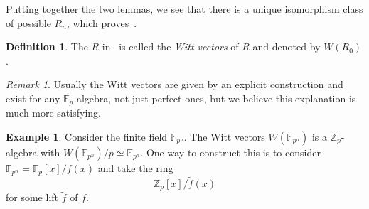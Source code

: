 \documentclass[10pt, oneside]{memoir}
\theoremstyle{definition}
\newtheorem{defn}[thm]{Definition}
\newtheorem{exm}[thm]{Example}
\theoremstyle{remark}
\newtheorem{rmk}[thm]{Remark}
\theoremstyle{plain}
\theoremstyle{definition}
\theoremstyle{remark}
\newcommand{\Z}{\mathbb{Z}}
\newcommand{\F}{\mathbb{F}}
\newcommand{\1}{\mathbf{1}}
\newcommand{\2}{\mathbf{2}}
\newcommand{\3}{\mathbf{3}}
\begin{document}
Putting together the two lemmas, we see that there is a unique isomorphism class of possible $R_n$, which proves~.

\begin{defn}
    The $R$ in~ is called the \textit{Witt vectors} of $R$ and denoted by $W(R_0)$.
\end{defn}

\begin{rmk}
    Usually the Witt vectors are given by an explicit construction and exist for any $\F_p$-algebra, not just perfect ones, but we believe this explanation is much more satisfying.
\end{rmk}

\begin{exm}
    Consider the finite field $\F_{p^n}$. The Witt vectors $W(\F_{p^n})$
    is a $\Z_p$-algebra with $W(\F_{p^n}) / p \simeq \F_{p^n}$. One way to construct this is to consider $\F_{p^n} = \F_p[x]/f(x)$ and take the ring
    \[ \Z_p[x]/\tilde{f}(x) \]
    for some lift $\tilde{f}$ of $f$.
\end{exm}
\end{document}
